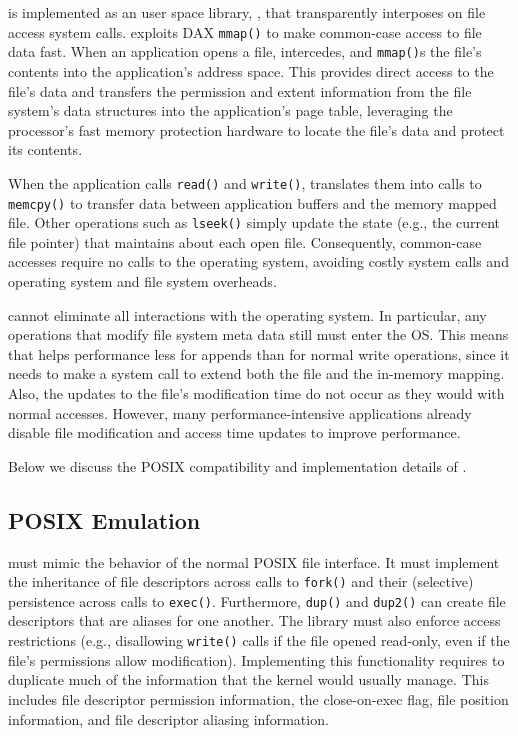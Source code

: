 \DAChell{} is implemented as an user space library, \libd{}, that transparently interposes on file access system calls.
\DAChell{} exploits DAX \texttt{mmap()} to make common-case access to file data
fast.  When an application opens a file, \DAChell{} intercedes, and
\texttt{mmap()}s the file's contents into the application's address space.
This provides direct access to the file's data and transfers the permission and
extent information from the file system's data structures into the
application's page table, leveraging the processor's fast memory
protection hardware to locate the file's data and protect its contents.

When the application calls \texttt{read()} and \texttt{write()}, \DAChell{}
translates them into calls to \texttt{memcpy()} to transfer data between
application buffers and the memory mapped file.  Other operations such as
\texttt{lseek()} simply update the state (e.g., the current file pointer) that
\DAChell{} maintains about each open file.  Consequently, common-case accesses
require no calls to the operating system, avoiding costly system calls and 
operating system and file system overheads.

\DAChell{} cannot eliminate all interactions with the operating system.  In
particular, any operations that modify file system meta data still must enter
the OS.  This means that \DAChell{} helps performance less for appends than for
normal write operations, since it needs to make a system call to extend both
the file and the in-memory mapping.  
Also, the updates to the file's modification time do not occur as they
would with normal accesses.  However, many performance-intensive applications
already disable file modification and access time updates to improve
performance.

Below we discuss the POSIX compatibility and implementation details of
\DAChell{}.

\subsection{POSIX Emulation}

\DAChell{} must mimic the behavior of the normal POSIX file
interface.  It must implement the inheritance of file descriptors across
calls to \texttt{fork()} and their (selective) persistence across calls to
\texttt{exec()}.  Furthermore, \texttt{dup()} and \texttt{dup2()} can create
file descriptors that are aliases for one another.  The library must also
enforce access restrictions (e.g., disallowing \texttt{write()} calls if the
file opened read-only, even if the file's permissions allow modification).
Implementing this functionality requires \DAChell{} to duplicate much of the
information that the kernel would usually manage.  This includes file
descriptor permission information, the close-on-exec flag, file position
information, and file descriptor aliasing information.

